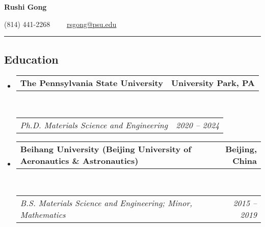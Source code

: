 \documentclass[10pt,letterpaper]{article}
\makeatletter
\newcommand{\headerrow}[2]
{\begin{tabular*}{\linewidth}{l@{\extracolsep{\fill}}r}
  #1 &
  #2 \\
\end{tabular*}}
\makeatother
\begin{document}
\begin{center}
{\LARGE \textbf{Rushi Gong}}



(814) 441-2268\ \ \textbullet
\ \ \href{mailto:rsgong@psu.edu}{rsgong@psu.edu}
\end{center}


\hrule
\vspace{-0.6em}
\subsection*{Education}

\begin{itemize}
  \parskip=0.1em

  \item
  \headerrow
    {\textbf{The Pennsylvania State University}}
    {\textbf{University Park, PA}}
  \\
  \headerrow
    {\emph{Ph.D. Materials Science and Engineering}}
    {\emph{2020 -- 2024}}


  \item
  \headerrow
    {\textbf{Beihang University (Beijing University of Aeronautics \& Astronautics)}}
    {\textbf{Beijing, China}}
  \\
  \headerrow
    {\emph{B.S. Materials Science and Engineering; Minor, Mathematics}}
    {\emph{2015 -- 2019}}

\end{itemize}


\end{document}
